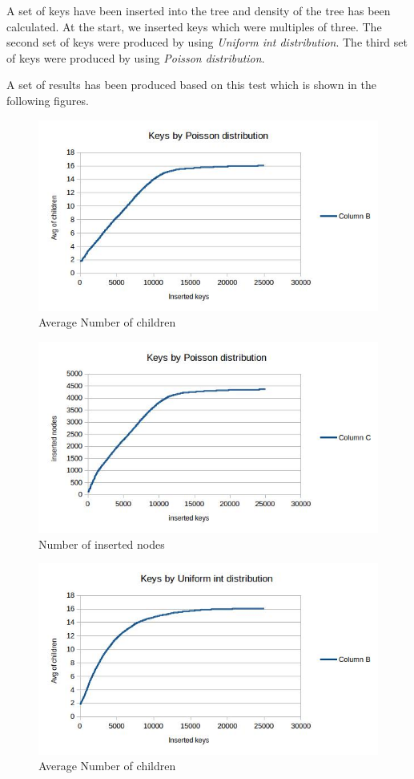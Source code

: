 \documentclass[12pt]{report}
\begin{document}
A set of keys have been inserted into the tree and density of the tree has been calculated. At the start, we inserted keys which were multiples of three. The second set of keys were produced by using \textit{Uniform int distribution}. The third set of keys were produced by using \textit{Poisson distribution}.

A set of results has been produced based on this test which is shown in the following figures.


\begin{figure}
  \includegraphics[scale=0.4]{Poissonchild}
  \caption{Average Number of children}
\end{figure}
  
\begin{figure}
  \includegraphics[scale=0.4]{Poissonnode}
  \caption{Number of inserted nodes}
\end{figure}

\begin{figure}
  \includegraphics[scale=0.4]{uniformchild}
  \caption{Average Number of children}
\end{figure}
\end{document}
